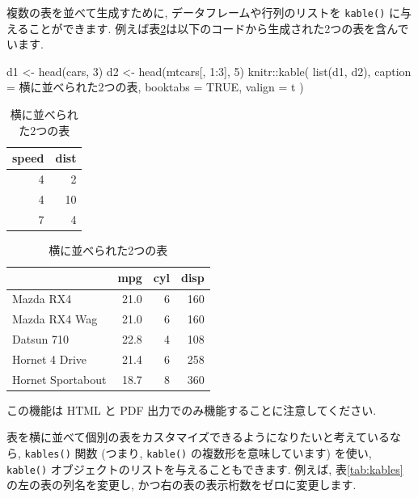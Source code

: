 \documentclass[
  11pt,
]{bxjsreport}
\newenvironment{Shaded}{\begin{snugshade}}{\end{snugshade}}
\newcommand{\AttributeTok}[1]{\textcolor[rgb]{0.77,0.63,0.00}{#1}}
\newcommand{\ConstantTok}[1]{\textcolor[rgb]{0.00,0.00,0.00}{#1}}
\newcommand{\DecValTok}[1]{\textcolor[rgb]{0.00,0.00,0.81}{#1}}
\newcommand{\FunctionTok}[1]{\textcolor[rgb]{0.00,0.00,0.00}{#1}}
\newcommand{\NormalTok}[1]{#1}
\newcommand{\OtherTok}[1]{\textcolor[rgb]{0.56,0.35,0.01}{#1}}
\newcommand{\SpecialCharTok}[1]{\textcolor[rgb]{0.00,0.00,0.00}{#1}}
\newcommand{\StringTok}[1]{\textcolor[rgb]{0.31,0.60,0.02}{#1}}
\begin{document}
複数の表を並べて生成すために, データフレームや行列のリストを \texttt{kable()} に与えることができます. 例えば表\ref{tab:two-tables}は以下のコードから生成された2つの表を含んでいます.

\begin{Shaded}
\begin{Highlighting}[numbers=left,,]
\NormalTok{d1 }\OtherTok{\textless{}{-}} \FunctionTok{head}\NormalTok{(cars, }\DecValTok{3}\NormalTok{)}
\NormalTok{d2 }\OtherTok{\textless{}{-}} \FunctionTok{head}\NormalTok{(mtcars[, }\DecValTok{1}\SpecialCharTok{:}\DecValTok{3}\NormalTok{], }\DecValTok{5}\NormalTok{)}
\NormalTok{knitr}\SpecialCharTok{::}\FunctionTok{kable}\NormalTok{(}
  \FunctionTok{list}\NormalTok{(d1, d2),}
  \AttributeTok{caption =} \StringTok{\textquotesingle{}横に並べられた2つの表\textquotesingle{}}\NormalTok{,}
  \AttributeTok{booktabs =} \ConstantTok{TRUE}\NormalTok{, }\AttributeTok{valign =} \StringTok{\textquotesingle{}t\textquotesingle{}}
\NormalTok{)}
\end{Highlighting}
\end{Shaded}

\begin{table}
\caption{\label{tab:two-tables}横に並べられた2つの表}

\centering
\begin{tabular}[t]{rr}
\toprule
speed & dist\\
\midrule
4 & 2\\
4 & 10\\
7 & 4\\
\bottomrule
\end{tabular}
\centering
\begin{tabular}[t]{lrrr}
\toprule
  & mpg & cyl & disp\\
\midrule
Mazda RX4 & 21.0 & 6 & 160\\
Mazda RX4 Wag & 21.0 & 6 & 160\\
Datsun 710 & 22.8 & 4 & 108\\
Hornet 4 Drive & 21.4 & 6 & 258\\
Hornet Sportabout & 18.7 & 8 & 360\\
\bottomrule
\end{tabular}
\end{table}

この機能は HTML と PDF 出力でのみ機能することに注意してください.

表を横に並べて個別の表をカスタマイズできるようになりたいと考えているなら, \texttt{kables()} 関数 (つまり, \texttt{kable()} の複数形を意味しています) を使い, \texttt{kable()} オブジェクトのリストを与えることもできます. 例えば, 表\ref{tab:kables}の左の表の列名を変更し, かつ右の表の表示桁数をゼロに変更します.
\end{document}
